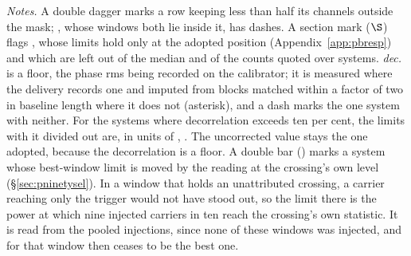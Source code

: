 \begin{table}
\centering
\caption{\textbf{Per-system sensitivity of the carrier search.} For each of
the \NSysClassA{} systems the fine-channel search covers, the
$\mathrm{EIRP}_{90}$ of its best window, retentions applied, in order of
the limit down the left half and then down the right half. Columns and
marks: Appendix~\ref{app:persys} and the notes below.}
\label{tab:persys}
\footnotesize


{\footnotesize\raggedright \emph{Notes.} A double dagger marks a row
keeping less than half its channels outside the mask; \NSysALostName, whose
\UmNWinALostWin{} windows both lie inside it, has dashes. A section mark
($\S$) flags \OmFlagStars, whose limits hold only at the adopted position
(Appendix~\ref{app:pbresp}) and which are left out of the median and of
the counts quoted over systems.
\emph{dec.} is a floor, the phase rms being recorded on the calibrator; it
is measured where the delivery records one and imputed from blocks matched
within a factor of two in baseline length where it does not (asterisk), and
a dash marks the one system with neither. For the \DcNBigTab{}
systems where decorrelation exceeds ten per cent\DcBigCondClause, the limits with it divided
out are, in units of \DcCorrUnit, \DcCorrClause. The uncorrected value stays
the one adopted, because the decorrelation is a floor.
A double bar (\XwMark) marks a system whose best-window limit is moved by
the reading at the crossing's own level (\S\ref{sec:pninetysel}). In a window
that holds an unattributed crossing, a carrier reaching only the trigger
would not have stood out, so the limit there is the power at which nine
injected carriers in ten reach the crossing's own statistic. It is read
from the pooled injections, since none of these windows was injected, and
for \XwSwitchNames{} that window then ceases to be the best one.\par}
\end{table}
